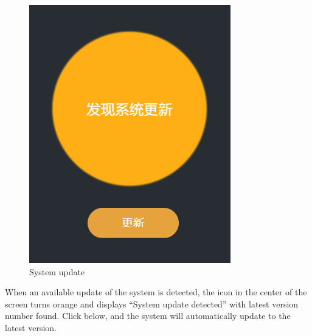 \begin{figure}[htb]
{\begin{minipage}[t]{0.3\linewidth}
		\includegraphics[width=\linewidth]{en/image/3-29.png}
	\end{minipage}}
	\caption{System update}
	\label{fig:系统更新}
\end{figure}

When an available update of the system is detected, the icon in the center of the screen turns orange and displays ``System update detected'' with latest version number found. Click  below, and the system will automatically update to the latest version.


